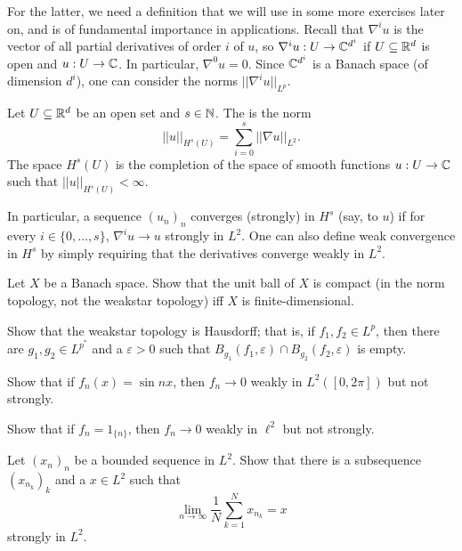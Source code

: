 For the latter, we need a definition that we will use in some more exercises later on, and is of fundamental importance in applications.
Recall that $\nabla^{i}u$ is the vector of all partial derivatives of order $i$ of $u$, so $\nabla^{i}u: U \to \mathbb{C}^{d^{i}}$ if $U \subseteq \mathbb{R}^{d}$ is open and $u: U \to \mathbb{C}$.
In particular, $\nabla^{0}u = 0$.
Since $\mathbb{C}^{d^{i}}$ is a Banach space (of dimension $d^{i}$), one can consider the norms $||\nabla^{i}u||_{L^{p}}$.

\begin{definition}
Let $U \subseteq \mathbb{R}^{d}$ be an open set and $s \in \mathbb{N}$.
The  is the norm
\[||u||_{H^{s}(U)} = \sum_{i=0}^{s} ||\nabla u||_{L^{2}}.\]
The space $H^{s}(U)$ is the completion of the space of smooth functions $u: U \to \mathbb{C}$ such that $||u||_{H^{s}(U)} < \infty$.
\end{definition}
In particular, a sequence ${(u_{n})}_{n}$ converges (strongly) in $H^{s}$ (say, to $u$) if for every $i \in \{0, \dots, s\}$, $\nabla^{i}u \to u$ strongly in $L^{2}$.
One can also define weak convergence in $H^{s}$ by simply requiring that the derivatives converge weakly in $L^{2}$.

\begin{exercise}\label{unit ball compactness}
Let $X$ be a Banach space. Show that the unit ball of $X$ is compact (in the norm topology, not the weakstar topology) iff $X$ is finite-dimensional.
\end{exercise}

\begin{exercise}\label{weakstar is hausdorff}
Show that the weakstar topology is Hausdorff; that is, if $f_{1}, f_{2} \in L^{p}$, then there are $g_{1}, g_{2} \in L^{p^{*}}$ and a $\varepsilon > 0$ such that $B_{g_{1}}(f_{1}, \varepsilon) \cap B_{g_{2}}(f_{2}, \varepsilon)$ is empty.
\end{exercise}

\begin{exercise}
Show that if $f_{n}(x) = \sin nx$, then $f_{n} \to 0$ weakly in $L^{2}([0, 2\pi])$ but not strongly.
\end{exercise}

\begin{exercise}
Show that if $f_{n} = 1_{\{n\}}$, then $f_{n} \to 0$ weakly in $\ell^{2}$ but not strongly.
\end{exercise}

\begin{exercise}
Let ${(x_{n})}_{n}$ be a bounded sequence in $L^{2}$. Show that there is a subsequence ${(x_{n_{k}})}_{k}$ and a $x \in L^{2}$ such that
\[\lim_{n \to \infty} \frac{1}{N} \sum_{k=1}^{N} x_{n_{k}} = x\]
strongly in $L^{2}$.
\end{exercise}

